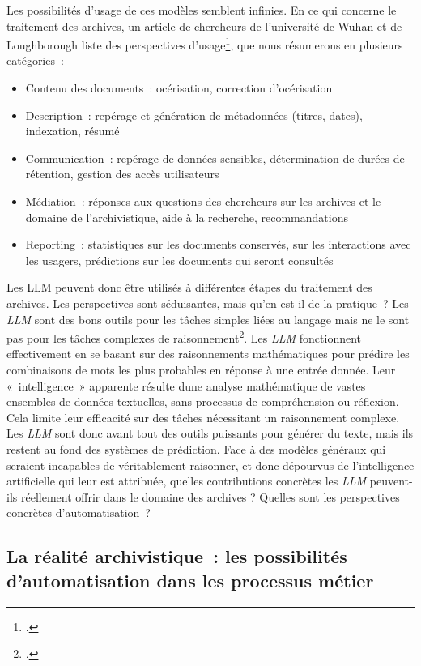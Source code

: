 	Les possibilités d'usage de ces modèles semblent infinies. En ce
	qui concerne le traitement des archives, un article de chercheurs de l'université de Wuhan et de Loughborough liste des
	perspectives d'usage\footcite{zhang_archives_2024},
	que nous résumerons en plusieurs catégories~:
	
	\begin{itemize}
		\item
		Contenu des documents~: océrisation, correction d'océrisation
		\item
		Description~: repérage et génération de métadonnées (titres, dates),
		indexation, résumé
		\item
		Communication~: repérage de données sensibles, détermination de durées
		de rétention, gestion des accès utilisateurs
		\item
		Médiation~: réponses aux questions des chercheurs sur les archives et
		le domaine de l'archivistique, aide à la recherche, recommandations
		\item
		Reporting~: statistiques sur les documents conservés, sur les
		interactions avec les usagers, prédictions sur les documents qui
		seront consultés
	\end{itemize}
	
	Les \gls{LLM} peuvent donc être utilisés à différentes étapes du traitement
	des archives.
		Les perspectives sont séduisantes, mais qu'en est-il de la pratique~?
	 Les \emph{LLM} sont des bons
	outils pour les tâches simples liées au langage mais ne le sont pas pour
	les tâches complexes de raisonnement\footcite{noauthor_medium_nodate}.
	Les \emph{LLM} fonctionnent effectivement en se basant sur
	des raisonnements  mathématiques pour prédire les combinaisons de mots les plus
	probables en réponse à une entrée donnée. Leur «~intelligence~»
	apparente résulte d\textquotesingle une analyse mathématique de vastes
	ensembles de données textuelles, sans processus de compréhension ou
	réflexion. Cela
	limite leur efficacité sur des tâches nécessitant un raisonnement
	complexe. Les \emph{LLM} sont donc avant tout des outils puissants pour générer
	du texte, mais ils restent au fond des systèmes de prédiction. Face à
	des modèles généraux qui seraient incapables de véritablement raisonner,
	et donc dépourvus de l'intelligence artificielle qui leur est attribuée,
	quelles contributions concrètes les \emph{LLM} peuvent-ils réellement offrir
	dans le domaine des archives ? Quelles sont les perspectives concrètes
	d'automatisation~?
	

\subsection{La réalité archivistique~: les possibilités d'automatisation dans les processus métier}
	
